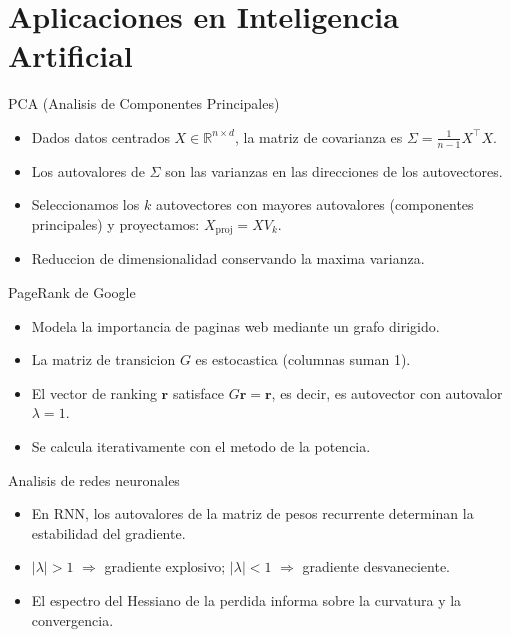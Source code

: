 \documentclass[aspectratio=169, 10pt, xcolor=table]{beamer}
\begin{document}
\section{Aplicaciones en Inteligencia Artificial}

\begin{frame}{PCA (Analisis de Componentes Principales)}
    \begin{itemize}
        \item Dados datos centrados $X\in\mathbb{R}^{n\times d}$, la matriz de covarianza es $\Sigma = \frac{1}{n-1}X^\top X$.
        \item Los autovalores de $\Sigma$ son las varianzas en las direcciones de los autovectores.
        \item Seleccionamos los $k$ autovectores con mayores autovalores (componentes principales) y proyectamos: $X_{\text{proj}} = X V_k$.
        \item Reduccion de dimensionalidad conservando la maxima varianza.
    \end{itemize}
\end{frame}

\begin{frame}{PageRank de Google}
    \begin{itemize}
        \item Modela la importancia de paginas web mediante un grafo dirigido.
        \item La matriz de transicion $G$ es estocastica (columnas suman 1).
        \item El vector de ranking $\mathbf{r}$ satisface $G\mathbf{r} = \mathbf{r}$, es decir, es autovector con autovalor $\lambda=1$.
        \item Se calcula iterativamente con el metodo de la potencia.
    \end{itemize}
\end{frame}

\begin{frame}{Analisis de redes neuronales}
    \begin{itemize}
        \item En RNN, los autovalores de la matriz de pesos recurrente determinan la estabilidad del gradiente.
        \item $|\lambda|>1$ $\Rightarrow$ gradiente explosivo; $|\lambda|<1$ $\Rightarrow$ gradiente desvaneciente.
        \item El espectro del Hessiano de la perdida informa sobre la curvatura y la convergencia.
    \end{itemize}
\end{frame}
\end{document}
